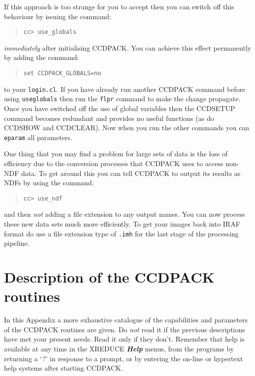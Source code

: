 \documentclass[twoside,11pt]{article}
\newcommand{\htmlref}[2]{#1}
\renewcommand{\_}{\texttt{\symbol{95}}}
\newcommand{\menu}[1]{{\small \bf \em #1}}
\newcommand{\text}[1]{{\small \tt #1}}
\newcommand{\routine}[1]{{\sc #1}}
\newcommand{\xroutine}[1]{\htmlref{{\sc #1}}{#1}}
\begin{document}
If this approach is too strange for you to accept then you can switch
off this behaviour by issuing the command:
\begin{quote}
\begin{verbatim}
cc> use_globals
\end{verbatim}
\end{quote}
{\em{immediately}} after initialising CCDPACK. You can achieve this effect
permanently by adding the command:
\begin{quote}
\begin{verbatim}
set CCDPACK_GLOBALS=no
\end{verbatim}
\end{quote}
to your \text{login.cl}. If you have already run another CCDPACK
command before using \text{use\_globals} then run the \text{flpr}
command to make the change propagate. Once you have switched off the
use of global variables then the \routine{CCDSETUP} command becomes
redundant and provides no useful functions (as do \routine{CCDSHOW}
and \routine{CCDCLEAR}). Now when you run the other
commands you can \text{eparam} all parameters.

One thing that you may find a problem for large sets of data is the
loss of efficiency due to the conversion processes that CCDPACK uses
to access non-NDF data. To get around this you can tell CCDPACK to
output its results as NDFs by using the command:
\begin{quote}
\begin{verbatim}
cc> use_ndf
\end{verbatim}
\end{quote}
and then {\em{not}} adding a file extension to any output names. You can
now process these new data sets much more efficiently. To get your
images back into IRAF format do use a file extension type of
\text{.imh} for the last stage of the processing pipeline.

\section{Description of the CCDPACK routines \label{app:description}}

In this Appendix a more exhaustive catalogue of the capabilities and parameters
of the CCDPACK routines are given. Do {\em{not}} read it if the previous
descriptions have met your present needs. Read it only if they don't. Remember
that help is available at any time in the \xroutine{XREDUCE}
\menu{Help} menus, from the programs by returning a `?' in response to a prompt,
or by entering the on-line or hypertext help systems after starting CCDPACK.
\end{document}
